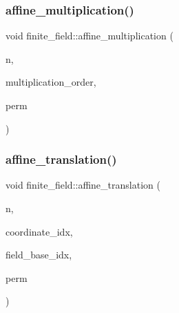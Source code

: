\subsubsection{\texorpdfstring{affine\+\_\+multiplication()}{affine\_multiplication()}}
{\footnotesize\ttfamily void finite\+\_\+field\+::affine\+\_\+multiplication (\begin{DoxyParamCaption}\item[{\mbox{\hyperlink{galois_8h_a09fddde158a3a20bd2dcadb609de11dc}{I\+NT}}}]{n,  }\item[{\mbox{\hyperlink{galois_8h_a09fddde158a3a20bd2dcadb609de11dc}{I\+NT}}}]{multiplication\+\_\+order,  }\item[{\mbox{\hyperlink{galois_8h_a09fddde158a3a20bd2dcadb609de11dc}{I\+NT}} $\ast$}]{perm }\end{DoxyParamCaption})}

\mbox{\label{classfinite__field_ad817e5978004de0189c84b348d8c9aae}} 
\subsubsection{\texorpdfstring{affine\+\_\+translation()}{affine\_translation()}}
{\footnotesize\ttfamily void finite\+\_\+field\+::affine\+\_\+translation (\begin{DoxyParamCaption}\item[{\mbox{\hyperlink{galois_8h_a09fddde158a3a20bd2dcadb609de11dc}{I\+NT}}}]{n,  }\item[{\mbox{\hyperlink{galois_8h_a09fddde158a3a20bd2dcadb609de11dc}{I\+NT}}}]{coordinate\+\_\+idx,  }\item[{\mbox{\hyperlink{galois_8h_a09fddde158a3a20bd2dcadb609de11dc}{I\+NT}}}]{field\+\_\+base\+\_\+idx,  }\item[{\mbox{\hyperlink{galois_8h_a09fddde158a3a20bd2dcadb609de11dc}{I\+NT}} $\ast$}]{perm }\end{DoxyParamCaption})}

\mbox{\label{classfinite__field_aa438c597593b89a5506e7456262d0155}} 
